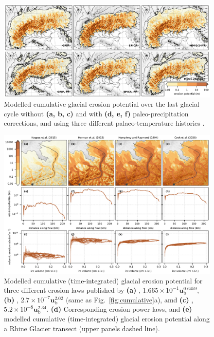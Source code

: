 \documentclass[utf8]{article}
\begin{document}
    \begin{figure}
      \centerline{\includegraphics{alpero_sensitivity}}
      \caption{%
        Modelled cumulative glacial erosion potential over the last glacial
        cycle without \textbf{(a, b, c)} and with \textbf{(d, e, f)}
        paleo-precipitation corrections, and using three different
        palaeo-temperature histories \citep[see][]{Seguinot.etal.2018}.}
      \label{fig:sensitivity}
    \end{figure}

    \begin{figure}
      \centerline{\includegraphics{alpero_powerlaws}}
      \caption{%
        Modelled cumulative (time-integrated) glacial erosion potential for
        three different erosion laws published by
        \textbf{(a)} \citet{Cook.etal.2020},
          $1.665 \times 10^{-1} \textbf{u}_\mathrm{b} ^{0.6459}$,
        \textbf{(b)} \citet{Herman.etal.2015},
          $2.7 \times 10^{-7} \textbf{u}_\mathrm{b} ^{2.02}$
          (same as Fig.~\ref{fig:cumulative}a), amd
        \textbf{(c)} \citet{Koppes.etal.2015},
          $5.2 \times 10^{-8} \textbf{u}_\mathrm{b} ^{2.34}$.
        \textbf{(d)} Corresponding erosion power laws, and
        \textbf{(e)} modelled cumulative (time-integrated) glacial erosion
          potential along a Rhine Glacier transect (upper panels dashed line).}
      \label{fig:powerlaws}
    \end{figure}



\end{document}
